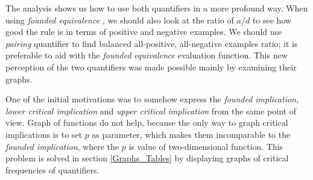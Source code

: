 The analysis shows us how to use both quantifiers in a more profound way. When using {\it founded equivalence \/}, we should also look at the ratio of $a/d$ to see how good the rule is in terms of positive and negative examples. We should use {\it pairing \/} quantifier to find balanced all-positive, all-negative examples ratio; it is preferable to aid
with the {\it founded equivalence \/} evaluation function. This new perception of the two quantifiers was made possible mainly by examining their graphs.

\medskip

One of the initial motivations was to somehow express the \emph{founded implication}, \emph{lower critical implication }and \emph{upper critical implication} from the same point of view. Graph of functions do not help, because the only way to graph critical implications is to set $p$ as parameter, which makes them incomparable to the \emph{founded implication}, where the $p$ is value of two-dimensional function. This problem is solved in section \ref{Graphs_Tables} by displaying graphs of critical frequencies of quantifiers. 